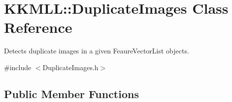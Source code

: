 \hypertarget{class_k_k_m_l_l_1_1_duplicate_images}{}\section{K\+K\+M\+LL\+:\+:Duplicate\+Images Class Reference}
\label{class_k_k_m_l_l_1_1_duplicate_images}


Detects duplicate images in a given Feaure\+Vector\+List objects.  




{\ttfamily \#include $<$Duplicate\+Images.\+h$>$}

\subsection*{Public Member Functions}
